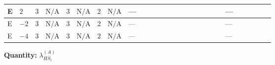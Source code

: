\documentclass[8pt]{article}
\begin{document}
\begin{landscape}
\begin{longtable}{@{}llcccccc >{\raggedright\arraybackslash}p{0.21\linewidth} >{\raggedright\arraybackslash}p{0.21\linewidth} >{\raggedright\arraybackslash}p{0.21\linewidth}@{}}
\midrule
E & $2$ & $3$ & $\text{N/A}$ & $3$ & $\text{N/A}$ & $2$ & $\text{N/A}$ & --- & \scriptsize\adjustbox{max width=\linewidth}{$\begin{gathered} -\frac{4}{3} {\lambda_5} \left({\lambda_5}\right)^{*}\end{gathered}$} & --- \\
\midrule
E & $-2$ & $3$ & $\text{N/A}$ & $3$ & $\text{N/A}$ & $2$ & $\text{N/A}$ & --- & \scriptsize\adjustbox{max width=\linewidth}{$\begin{gathered} -\frac{4}{3} {\lambda_5} \left({\lambda_5}\right)^{*}\end{gathered}$} & --- \\
\midrule
E & $-4$ & $3$ & $\text{N/A}$ & $3$ & $\text{N/A}$ & $2$ & $\text{N/A}$ & --- & \scriptsize\adjustbox{max width=\linewidth}{$\begin{gathered} -\frac{4}{3} {\lambda_5} \left({\lambda_5}\right)^{*}\end{gathered}$} & --- \\
\midrule
\bottomrule
\end{longtable}
\clearpage
\noindent\textbf{Quantity: }$\lambda_{HS_1}^{(A)}$\par\smallskip

\end{landscape}
\end{document}
